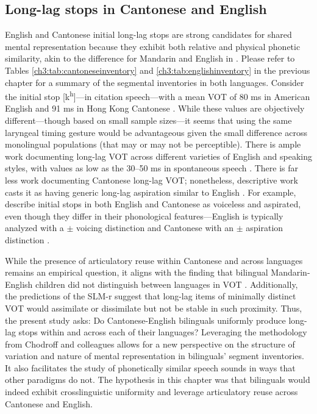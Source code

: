 \subsection{Long-lag stops in Cantonese and English}\label{ch4:sec:rqs}

English and Cantonese initial long-lag stops are strong candidates for shared mental representation because they exhibit both relative and physical phonetic similarity, akin to the difference for Mandarin and English in \citet{yang_2019_vot}. Please refer to Tables \ref{ch3:tab:cantoneseinventory} and \ref{ch3:tab:englishinventory} in the previous chapter for a summary of the segmental inventories in both languages. Consider the initial stop [k\textsuperscript{h}]---in citation speech---with a mean VOT of 80 ms in American English \citep{lisker_1964_vot} and 91 ms in Hong Kong Cantonese \citep{clumeck_1981_cantonese}. While these values are objectively different---though based on small sample sizes---it seems that using the same laryngeal timing gesture would be advantageous given the small difference across monolingual populations (that may or may not be perceptible). There is ample work documenting long-lag VOT across different varieties of English and speaking styles, with values as low as the 30--50 ms in spontaneous speech \citep{stuartsmith_2015_private}. There is far less work documenting Cantonese long-lag VOT; nonetheless, descriptive work casts it as having generic long-lag aspiration similar to English \citep{matthews_2013_cantonese, bauer_1997_cantonese, chan_2000_english, mielke_2018_voice}. For example, \citet{matthews_2013_cantonese} describe initial stops in both English and Cantonese as voiceless and aspirated, even though they differ in their phonological features---English is typically analyzed with a $\pm$ voicing distinction and Cantonese with an $\pm$ aspiration distinction \citep{matthews_2013_cantonese}.
 
While the presence of articulatory reuse within Cantonese and across languages remains an empirical question, it aligns with the finding that bilingual Mandarin-English children did not distinguish between languages in VOT \citep{yang_2019_vot}. Additionally, the predictions of the SLM-r \citep{flege_2021_slmr} suggest that long-lag items of minimally distinct VOT would assimilate or dissimilate but not be stable in such proximity. Thus, the present study asks: Do Cantonese-English bilinguals uniformly produce long-lag stops within and across each of their languages? Leveraging the methodology from Chodroff and colleagues \citep{chodroff_2017_structure, chodroff_2018_predictability, chodroff_2019_l2} allows for a new perspective on the structure of variation and nature of mental representation in bilinguals' segment inventories. It also facilitates the study of phonetically similar speech sounds in ways that other paradigms do not. The hypothesis in this chapter was that bilinguals would indeed exhibit crosslinguistic uniformity and leverage articulatory reuse across Cantonese and English. 

